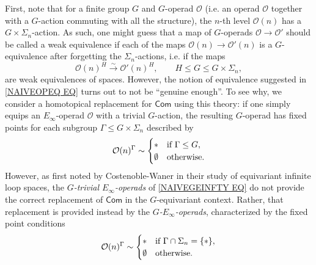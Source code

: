 \documentclass[a4paper,10pt
,draft
]{article}%
\numberwithin{equation}{section}
\numberwithin{figure}{section}
\theoremstyle{definition} %
\renewcommand{\O}{\ensuremath{\mathcal O}}
\newcommand{\1}{\ensuremath{\mathbbm 1}}%
\begin{document}
First, note that for a finite group $G$ and $G$-operad $\O$ (i.e. an operad $\O$ together with a $G$-action commuting with all the structure),
the $n$-th level $\O(n)$ has a $G \times \Sigma_n$-action.
As such, one might guess that a map of $G$-operads
$\O \to \O'$
should be called a weak equivalence if each of the maps
$\O(n) \to \O'(n)$
is a $G$-equivalence after forgetting the $\Sigma_n$-actions, 
i.e. if the maps
\begin{equation}\label{NAIVEOPEQ EQ}
	\O(n)^H \xrightarrow{\sim} \O'(n)^H, \qquad H \leq G \leq G\times \Sigma_n,
\end{equation}
are weak equivalences of spaces. 
However, the notion of equivalence suggested in \eqref{NAIVEOPEQ EQ} turns out to not be ``genuine enough''.
To see why, we consider a homotopical replacement for $\mathsf{Com}$ using this theory: 
if one simply equips an $E_{\infty}$-operad $\O$ with a trivial $G$-action, the resulting $G$-operad has fixed points for each subgroup $\Gamma \leq G \times \Sigma_n$ described by
\begin{equation}\label{NAIVEGEINFTY EQ}
	\O(n)^{\Gamma} \sim 
\begin{cases}
	\** & \text{if } \Gamma \leq G,
\\
	\emptyset & \text{otherwise}.
\end{cases}
\end{equation}
However, as first noted by Costenoble-Waner \cite{CW91} in their study of equivariant infinite loop spaces,
the \textit{$G$-trivial $E_\infty$-operads} of \eqref{NAIVEGEINFTY EQ} do not provide 
the correct replacement of $\mathsf{Com}$
 in the $G$-equivariant context. 
Rather, that replacement is provided instead by the 
\textit{$G$-$E_{\infty}$-operads}, characterized by the fixed point conditions
\begin{equation}\label{GENGEINFTY EQ}
	\O(n)^{\Gamma} \sim 
\begin{cases}
	\** & \text{if } \Gamma \cap \Sigma_n = \{\**\},
\\
	\emptyset & \text{otherwise}.
\end{cases}
\end{equation}
\end{document}
